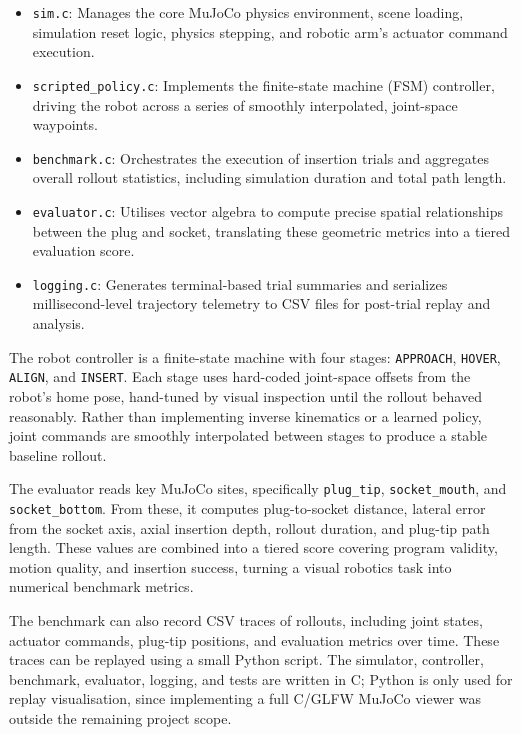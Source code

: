 \documentclass[11pt]{article}
\begin{document}
\begin{itemize}
    \item \texttt{sim.c}: Manages the core MuJoCo physics environment, scene loading, simulation reset logic, physics stepping, and robotic arm's actuator command execution.
    \item \texttt{scripted\_policy.c}: Implements the finite-state machine (FSM) controller, driving the robot across a series of smoothly interpolated, joint-space waypoints.
    \item \texttt{benchmark.c}: Orchestrates the execution of insertion trials and aggregates overall rollout statistics, including simulation duration and total path length.
    \item \texttt{evaluator.c}: Utilises vector algebra to compute precise spatial relationships between the plug and socket, translating these geometric metrics into a tiered evaluation score.
    \item \texttt{logging.c}: Generates terminal-based trial summaries and serializes millisecond-level trajectory telemetry to CSV files for post-trial replay and analysis.
\end{itemize}
The robot controller is a finite-state machine with four stages: \texttt{APPROACH}, \texttt{HOVER}, \texttt{ALIGN}, and \texttt{INSERT}. Each stage uses hard-coded joint-space offsets from the robot's home pose, hand-tuned by visual inspection until the rollout behaved reasonably. Rather than implementing inverse kinematics or a learned policy, joint commands are smoothly interpolated between stages to produce a stable baseline rollout.

The evaluator reads key MuJoCo sites, specifically \texttt{plug\_tip}, \texttt{socket\_mouth}, and \texttt{socket\_bottom}. From these, it computes plug-to-socket distance, lateral error from the socket axis, axial insertion depth, rollout duration, and plug-tip path length. These values are combined into a tiered score covering program validity, motion quality, and insertion success, turning a visual robotics task into numerical benchmark metrics.

The benchmark can also record CSV traces of rollouts, including joint states, actuator commands, plug-tip positions, and evaluation metrics over time. These traces can be replayed using a small Python script. The simulator, controller, benchmark, evaluator, logging, and tests are written in C; Python is only used for replay visualisation, since implementing a full C/GLFW MuJoCo viewer was outside the remaining project scope.
\end{document}
